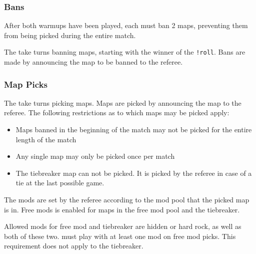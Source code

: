 \subsubsection{Bans}
After both warmups have been played, each  must ban 2 maps, preventing them from being picked during the entire match.

The  take turns banning maps, starting with the winner of the \texttt{!roll}. Bans are made by announcing the map to be banned to the referee.

\subsubsection{Map Picks}
The  take turns picking maps. Maps are picked by announcing the map to the referee. The following restrictions as to which maps may be picked apply:

\begin{samepage}
\begin{itemize}
	\item Maps banned in the beginning of the match may not be picked for the entire length of the match
	\item Any single map may only be picked once per match
	\item The tiebreaker map can not be picked. It is picked by the referee in case of a tie at the last possible game.
\end{itemize}
\end{samepage}

The mods are set by the referee according to the mod pool that the picked map is in. Free mods is enabled for maps in the free mod pool and the tiebreaker.

Allowed mods for free mod and tiebreaker are hidden or hard rock, as well as both of these two.
must play with at least one mod on free mod picks. This requirement does not apply to the tiebreaker.

